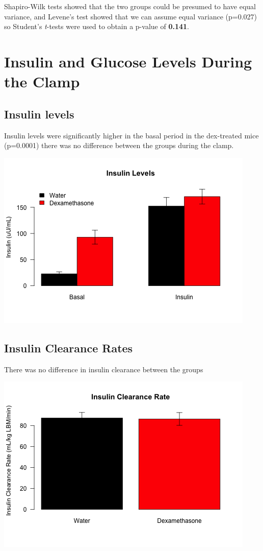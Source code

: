 \documentclass[]{article}
\begin{document}
Shapiro-Wilk tests showed that the two groups could be presumed to have
equal variance, and Levene's test showed that we can assume equal
variance (p=0.027) so Student's \emph{t}-tests were used to obtain a
p-value of \textbf{0.141}.

\section{Insulin and Glucose Levels During the
Clamp}\label{insulin-and-glucose-levels-during-the-clamp}

\subsection{Insulin levels}\label{insulin-levels}

Insulin levels were significantly higher in the basal period in the
dex-treated mice (p=0.0001) there was no difference between the groups
during the clamp.

\includegraphics{figures/insulin-barplot-hfd-1.png}

\subsection{Insulin Clearance Rates}\label{insulin-clearance-rates}

There was no difference in insulin clearance between the groups

\includegraphics{figures/insulin-clearance-barplot-hfd-1.png}
\end{document}
